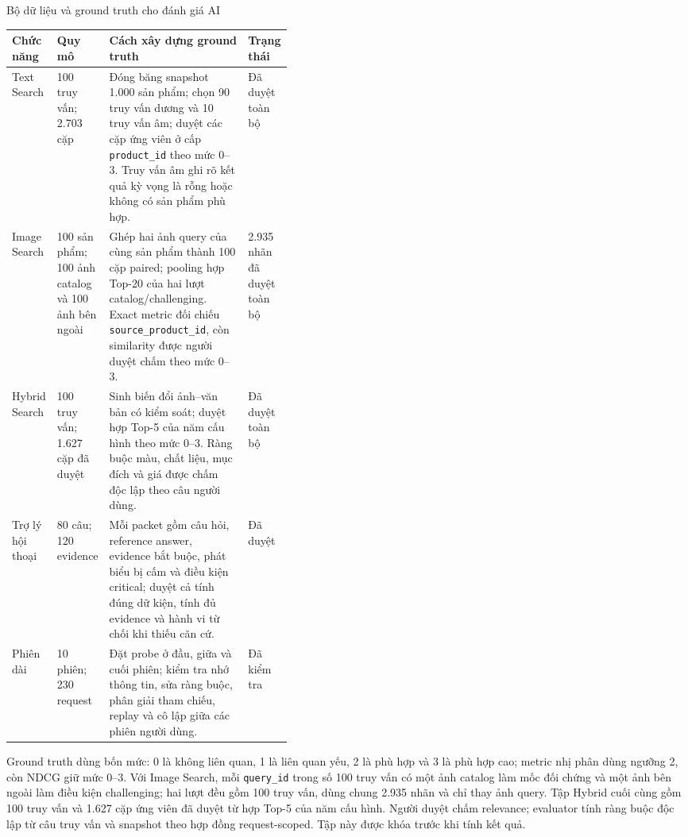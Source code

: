 \begin{breakabletable}
\centering
\caption{Bộ dữ liệu và ground truth cho đánh giá AI}
\label{tab:ai-evaluation-data}
\small
\begin{tabularx}{\linewidth}{|p{0.15\linewidth}|p{0.14\linewidth}|X|p{0.12\linewidth}|}
\hline
\textbf{Chức năng} & \textbf{Quy mô} & \textbf{Cách xây dựng ground truth} & \textbf{Trạng thái} \\ \hline
Text Search & 100 truy vấn; 2.703 cặp & Đóng băng snapshot 1.000 sản phẩm; chọn 90 truy vấn dương và 10 truy vấn âm; duyệt các cặp ứng viên ở cấp \texttt{product\_id} theo mức 0--3. Truy vấn âm ghi rõ kết quả kỳ vọng là rỗng hoặc không có sản phẩm phù hợp. & Đã duyệt toàn bộ \\ \hline
Image Search & 100 sản phẩm; 100 ảnh catalog và 100 ảnh bên ngoài & Ghép hai ảnh query của cùng sản phẩm thành 100 cặp paired; pooling hợp Top-20 của hai lượt catalog/challenging. Exact metric đối chiếu \texttt{source\_product\_id}, còn similarity được người duyệt chấm theo mức 0--3. & 2.935 nhãn đã duyệt toàn bộ \\ \hline
Hybrid Search & 100 truy vấn; 1.627 cặp đã duyệt & Sinh biến đổi ảnh--văn bản có kiểm soát; duyệt hợp Top-5 của năm cấu hình theo mức 0--3. Ràng buộc màu, chất liệu, mục đích và giá được chấm độc lập theo câu người dùng. & Đã duyệt toàn bộ \\ \hline
Trợ lý hội thoại & 80 câu; 120 evidence & Mỗi packet gồm câu hỏi, reference answer, evidence bắt buộc, phát biểu bị cấm và điều kiện critical; duyệt cả tính đúng dữ kiện, tính đủ evidence và hành vi từ chối khi thiếu căn cứ. & Đã duyệt \\ \hline
Phiên dài & 10 phiên; 230 request & Đặt probe ở đầu, giữa và cuối phiên; kiểm tra nhớ thông tin, sửa ràng buộc, phân giải tham chiếu, replay và cô lập giữa các phiên người dùng. & Đã kiểm tra \\ \hline
\end{tabularx}
\end{breakabletable}

Ground truth dùng bốn mức: 0 là không liên quan, 1 là liên quan yếu, 2 là phù hợp và 3 là phù hợp cao; metric nhị phân dùng ngưỡng 2, còn NDCG giữ mức 0--3. Với Image Search, mỗi \texttt{query\_id} trong số 100 truy vấn có một ảnh catalog làm mốc đối chứng và một ảnh bên ngoài làm điều kiện challenging; hai lượt đều gồm 100 truy vấn, dùng chung 2.935 nhãn và chỉ thay ảnh query. Tập Hybrid cuối cùng gồm 100 truy vấn và 1.627 cặp ứng viên đã duyệt từ hợp Top-5 của năm cấu hình. Người duyệt chấm relevance; evaluator tính ràng buộc độc lập từ câu truy vấn và snapshot theo hợp đồng request-scoped. Tập này được khóa trước khi tính kết quả.

